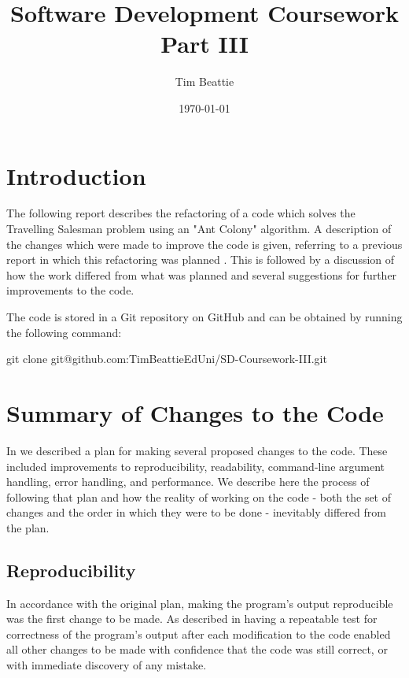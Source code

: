 \documentclass[11pt, oneside]{article}   %
\title{Software Development Coursework Part III}
\author{Tim Beattie}
\date{\today}
\begin{document}
\maketitle

\newpage

\tableofcontents

\newpage


\section{Introduction}
The following report describes the refactoring of a code which solves the Travelling Salesman problem using an "Ant Colony" algorithm.
A description of the changes which were made to improve the code is given, referring to a previous report in which this refactoring was planned \cite{ref:Part-I}.
This is followed by a discussion of how the work differed from what was planned and several suggestions for further improvements to the code.

The code is stored in a Git repository on GitHub and can be obtained by running the following command:

git clone git@github.com:TimBeattieEdUni/SD-Coursework-III.git

\section{Summary of Changes to the Code}
In \cite{ref:Part-I} we described a plan for making several proposed changes to the code.
These included improvements to reproducibility, readability, command-line argument handling, error handling, and performance.
We describe here the process of following that plan and how the reality of working on the code - both the set of changes and the order in which they were to be done - inevitably differed from the plan.

\subsection{Reproducibility}

In accordance with the original plan, making the program's output reproducible was the first change to be made.
As described in \cite{ref:Part-I} having a repeatable test for correctness of the program's output after each modification to the code enabled all other changes to be made with confidence that the code was still correct, or with immediate discovery of any mistake.  
\end{document}

